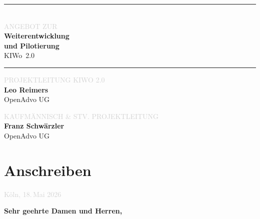 \documentclass[11pt,a4paper,openany]{report}
\begin{document}
\begin{titlepage}
\vspace{1.8cm}

\noindent
{\color{primarycolor}\rule{\textwidth}{1.5pt}}\\[0.8em]
{\sffamily\fontsize{11pt}{13pt}\selectfont\textcolor{lightgray}{\MakeUppercase{Angebot zur}}}\\[0.4em]
{\sffamily\fontsize{32pt}{38pt}\selectfont\bfseries\color{primarycolor}Weiterentwicklung}\\[0.2em]
{\sffamily\fontsize{32pt}{38pt}\selectfont\bfseries\color{primarycolor}und Pilotierung}\\[0.4em]
{\sffamily\fontsize{24pt}{28pt}\selectfont\color{darkgray} KIWo~2.0}\\[1em]
{\color{primarycolor}\rule{\textwidth}{1.5pt}}

\vfill

\noindent
\begin{minipage}[t]{0.48\textwidth}
  {\sffamily\small\textcolor{lightgray}{\MakeUppercase{Projektleitung KIWo 2.0}}}\\[0.4em]
  {\sffamily\bfseries Leo Reimers}\\
  {\small OpenAdvo UG}
\end{minipage}\hfill
\begin{minipage}[t]{0.48\textwidth}
  \raggedleft
  {\sffamily\small\textcolor{lightgray}{\MakeUppercase{Kaufmännisch \& Stv. Projektleitung}}}\\[0.4em]
  {\sffamily\bfseries Franz Schwärzler}\\
  {\small OpenAdvo UG}
\end{minipage}

\vspace{0.6cm}
\noindent{\color{tabrule}\rule{\textwidth}{0.4pt}}
\end{titlepage}

\renewcommand{\contentsname}{\sffamily\color{primarycolor}Inhalt}
\begingroup
\sffamily
\tableofcontents
\endgroup
\newpage

\chapter{Anschreiben}

\noindent
{\sffamily\small\textcolor{lightgray}{Köln, 18.\,Mai 2026}}

\vspace{1.5em}
\noindent
{\sffamily\large\bfseries\color{primarycolor}Sehr geehrte Damen und Herren,}
\end{document}
